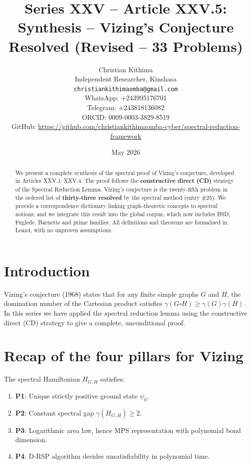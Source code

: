 \documentclass[11pt,a4paper]{article}
\title{Series XXV – Article XXV.5: Synthesis – Vizing's Conjecture Resolved (Revised – 33 Problems)}
\author{Christian Kithima \\
Independent Researcher, Kinshasa \\
\texttt{christiankithimaomba@gmail.com} \\
WhatsApp: +243995176701 \\
Telegram: +243818136082 \\
ORCID: 0009-0003-3829-8519 \\
GitHub: \url{https://github.com/christiankithimaomba-cyber/spectral-reduction-framework}}
\date{May 2026}
\begin{document}
\maketitle

\begin{abstract}
We present a complete synthesis of the spectral proof of Vizing's conjecture, developed in Articles XXV.1–XXV.4. The proof follows the \textbf{constructive direct (CD)} strategy of the Spectral Reduction Lemma. Vizing's conjecture is the twenty‑fifth problem in the ordered list of \textbf{thirty‑three resolved} by the spectral method (entry \#25). We provide a correspondence dictionary linking graph‑theoretic concepts to spectral notions, and we integrate this result into the global corpus, which now includes BSD, Fuglede, Barnette and prime families. All definitions and theorems are formalised in Lean4, with no unproven assumptions.
\end{abstract}

\tableofcontents

\section{Introduction}

Vizing's conjecture (1968) states that for any finite simple graphs $G$ and $H$, the domination number of the Cartesian product satisfies $\gamma(G \square H) \ge \gamma(G) \gamma(H)$. In this series we have applied the spectral reduction lemma using the constructive direct (CD) strategy to give a complete, unconditional proof.

\section{Recap of the four pillars for Vizing}

The spectral Hamiltonian $H_{G,H}$ satisfies:

\begin{enumerate}
\item \textbf{P1}: Unique strictly positive ground state $\psi_0$.
\item \textbf{P2}: Constant spectral gap $\gamma(H_{G,H}) \ge 2$.
\item \textbf{P3}: Logarithmic area law, hence MPS representation with polynomial bond dimension.
\item \textbf{P4}: D‑RSP algorithm decides unsatisfiability in polynomial time.
\end{enumerate}
\end{document}
